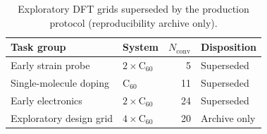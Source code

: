 \begin{table}[t]
\caption{\label{tab:inventory_archive}Exploratory DFT grids superseded by the production protocol (reproducibility archive only).}
\begin{ruledtabular}
\begin{tabular}{llrl}
Task group & System & $N_{\mathrm{conv}}$ & Disposition \\
\hline
Early strain probe & $2{\times}\mathrm{C}_{60}$ & 5 & Superseded \\
Single-molecule doping & C$_{60}$ & 11 & Superseded \\
Early electronics & $2{\times}\mathrm{C}_{60}$ & 24 & Superseded \\
Exploratory design grid & $4{\times}\mathrm{C}_{60}$ & 20 & Archive only \\
\end{tabular}
\end{ruledtabular}
\end{table}
